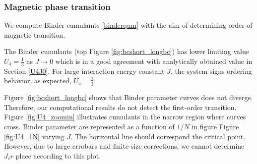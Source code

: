 \subsubsection{Magnetic phase transition} \label{sec:crossing}

We compute Binder cumulamts \eqref{binderqum} with the aim of determining  order of magnetic transition. 

The Binder cumulants (top Figure \ref{fig:bcshort_longbc}) has lower limiting value $U_4=\frac{1}{3}$ as $J\rightarrow 0$ which is in a good agreement with analytically obtained value in Section \ref{U4J0}. For large interaction energy  constant $J$, the system  signs ordering behavior, as expected, $U_4=\frac{2}{3}$. 


 Figure \ref{fig:bcshort_longbc} shows that Binder parameter curves does not diverge. Therefore, our computational results do not detect the first-order transition. Figure \ref{fig:U4_zoomin} illustrates cumulants in the narrow region where curves cross. %
 Binder parameter are represented as a function of $1/N$ in figure Figure \ref{fig:U4_1N} varying $J$. The horizontal line should correspond the critical point. However, due to  large errobars and finite-size corrections, we cannot determine $J_cr$ place according to this plot. 

